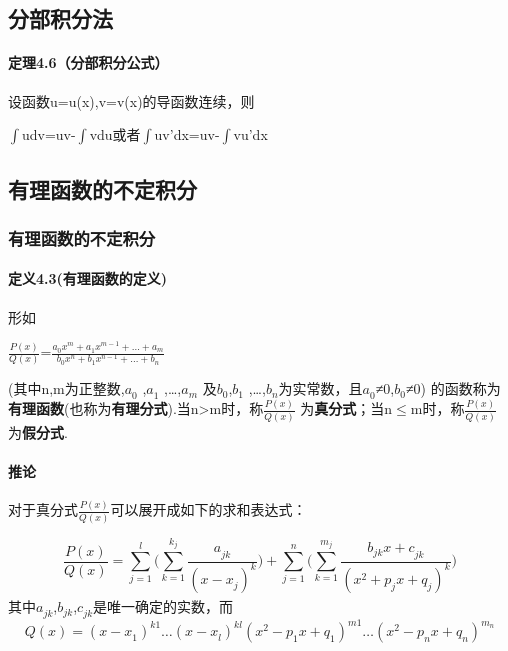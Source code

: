 \documentclass[12pt, a4paper, oneside]{ctexart}
\begin{document}
\vskip 1cm
\subsection{分部积分法}
\vskip 1cm
\paragraph{定理4.6（分部积分公式）}设函数u=u(x),v=v(x)的导函数连续，则
\begin{center}
    $\int $udv=uv-$\int $vdu或者$\int $uv'dx=uv-$\int $vu'dx
\end{center}

\vskip 1cm
\subsection{有理函数的不定积分}
\vskip 1cm
\subsubsection{有理函数的不定积分}
\paragraph{定义4.3(有理函数的定义)}形如
\begin{center}
    $\frac{P(x)}{Q(x)}$=$\frac{a_{0}^{} x_{}^{m} +a_{1}^{} x_{}^{m-1} +\dots +a_{m}^{} }{b_{0}^{} x_{}^{n} +b_{1}^{} x_{}^{n-1} +\dots +b_{n}^{} }$
\end{center}
(其中n,m为正整数,$a_{0}^{}$ ,$a_{1}^{}$ ,\dots ,$a_{m}^{}$ 及$b_{0}^{} $,$b_{1}^{}$ ,\dots ,$b_{n}^{} $为实常数，且$a_{0}^{} $≠0,$b_{0}^{} $≠0)
\newline
的函数称为\textbf{有理函数}(也称为\textbf{有理分式}).当n>m时，称$\frac{P(x)}{Q(x)}$ 为\textbf{真分式}；当n$\leq $m时，称$\frac{P(x)}{Q(x)}$ 为\textbf{假分式}.
		
\paragraph{推论}对于真分式$\frac{P(x)}{Q(x)}$可以展开成如下的求和表达式：

\begin{equation}
	\frac{P(x)}{Q(x)}=\sum_{j=1}^{l} \Big(\sum_{k=1}^{k_{j}} \frac{a_{jk}^{}}{(x-x_{j}^{})_{}^{k}} \Big)+\sum_{j=1}^{n} \Big(\sum_{k=1}^{m_{j}} \frac{b_{jk}^{}x+c_{jk}^{}}{({x_{}^{2}+p_{j}^{}x+q_{j}^{}})^{k}} \Big)
\end{equation}
其中$a_{jk}^{}$,$b_{jk}^{}$,$c_{jk}^{}$是唯一确定的实数，而
\begin{equation}
	Q(x)=(x-x_{1}^{})_{}^{k1}\dots (x-x_{l}^{})_{}^{kl}(x_{}^{2}-p_{1}^{}x+q_{1}^{})_{}^{m1}\dots (x_{}^{2}-p_{n}^{}x+q_{n}^{})_{}^{m_{n}^{}}
\end{equation}
\end{document}

